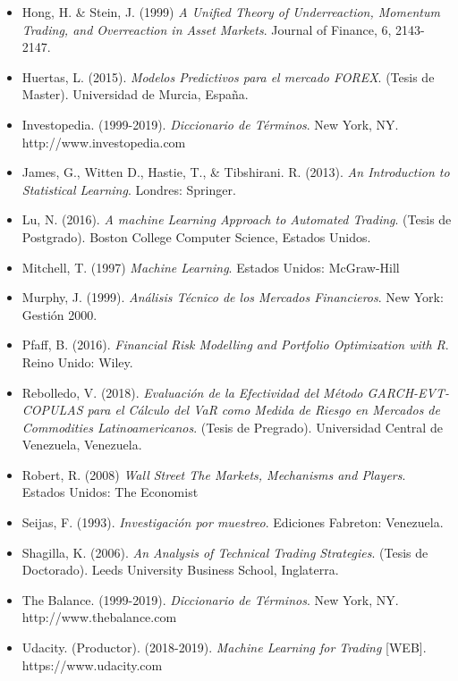\documentclass[a4paper,12pt]{Latex/Classes/PhDthesisPSnPDF}
\begin{document}
\begin{itemize}
\item Hong, H. \& Stein, J. (1999) \textit{A Unified Theory of Underreaction, Momentum Trading, and Overreaction in Asset Markets}. Journal of Finance, 6, 2143-2147.

\item Huertas, L. (2015). \textit{Modelos Predictivos para el mercado FOREX}. (Tesis de Master). Universidad de Murcia, España.

\item Investopedia. (1999-2019). \textit{Diccionario de Términos}. New York, NY. http://www.investopedia.com

\item James, G., Witten D., Hastie, T., \& Tibshirani. R. (2013). \textit{An Introduction to Statistical Learning}. Londres: Springer.

\item Lu, N. (2016). \textit{A machine Learning Approach to Automated Trading}. (Tesis de Postgrado). Boston College Computer Science, Estados Unidos.

\item Mitchell, T. (1997) \textit{Machine Learning}. Estados Unidos: McGraw-Hill

\item Murphy, J. (1999). \textit{Análisis Técnico de los Mercados Financieros}. New York: Gestión 2000.

\item Pfaff, B. (2016). \textit{Financial Risk Modelling and Portfolio Optimization with R}. Reino Unido: Wiley.

\item Rebolledo, V. (2018). \textit{Evaluación de la Efectividad del Método GARCH-EVT-COPULAS para el Cálculo del VaR como Medida de Riesgo en Mercados de Commodities Latinoamericanos}. (Tesis de Pregrado). Universidad Central de Venezuela, Venezuela.

\item Robert, R. (2008) \textit{Wall Street The Markets, Mechanisms and Players}. Estados Unidos: The Economist

\item Seijas, F. (1993). \textit{Investigación por muestreo}. Ediciones Fabreton: Venezuela.

\item Shagilla, K. (2006). \textit{An Analysis of Technical Trading Strategies}. (Tesis de Doctorado). Leeds University Business School, Inglaterra.

\item The Balance. (1999-2019). \textit{Diccionario de Términos}. New York, NY. http://www.thebalance.com

\item Udacity. (Productor). (2018-2019). \textit{Machine Learning for Trading} [WEB]. https://www.udacity.com

\end{itemize}
\end{document}
